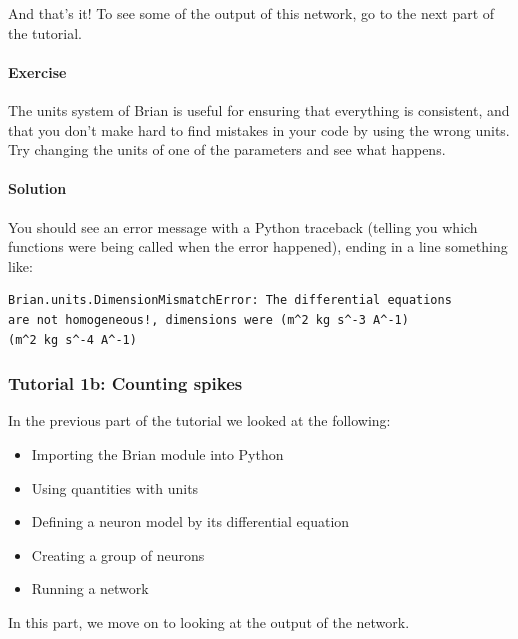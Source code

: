 \documentclass[letterpaper,10pt]{manual}
\begin{document}
And that's it! To see some of the output of this network, go
to the next part of the tutorial.


\paragraph{Exercise}

The units system of Brian is useful for ensuring that everything
is consistent, and that you don't make hard to find mistakes in
your code by using the wrong units. Try changing the units of one
of the parameters and see what happens.


\paragraph{Solution}

You should see an error message with a Python traceback (telling
you which functions were being called when the error happened),
ending in a line something like:

\begin{Verbatim}[commandchars=@\[\]]
Brian.units.DimensionMismatchError: The differential equations
are not homogeneous!, dimensions were (m^2 kg s^-3 A^-1)
(m^2 kg s^-4 A^-1)
\end{Verbatim}

\resetcurrentobjects


\subsubsection{Tutorial 1b: Counting spikes}

In the previous part of the tutorial we looked at the following:
\begin{itemize}
\item {} 
Importing the Brian module into Python

\item {} 
Using quantities with units

\item {} 
Defining a neuron model by its differential equation

\item {} 
Creating a group of neurons

\item {} 
Running a network

\end{itemize}

In this part, we move on to looking at the output of the network.
\end{document}
